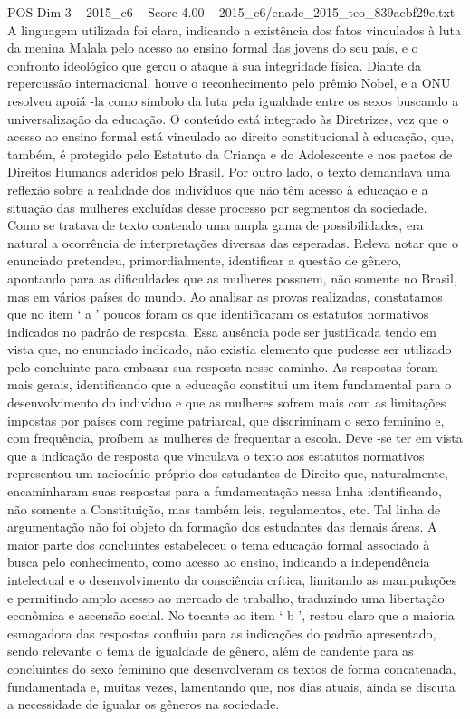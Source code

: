 \begin{textsample}{POS Dim 3 – 2015\_c6 – Score 4.00 – 2015\_c6/enade\_2015\_teo\_839aebf29e.txt}
A linguagem utilizada foi clara, indicando a existência dos fatos vinculados à luta da menina Malala pelo acesso ao ensino formal das jovens do seu país, e o confronto ideológico que gerou o ataque à sua integridade física.
Diante da repercussão internacional, houve o reconhecimento pelo prêmio Nobel, e a ONU resolveu apoiá -la como símbolo da luta pela igualdade entre os sexos buscando a universalização da educação.
O conteúdo está integrado às Diretrizes, vez que o acesso ao ensino formal está vinculado ao direito constitucional à educação, que, também, é protegido pelo Estatuto da Criança e do Adolescente e nos pactos de Direitos Humanos aderidos pelo Brasil.
Por outro lado, o texto demandava uma reflexão sobre a realidade dos indivíduos que não têm acesso à educação e a situação das mulheres excluídas desse processo por segmentos da sociedade.
Como se tratava de texto contendo uma ampla gama de possibilidades, era natural a ocorrência de interpretações diversas das esperadas.
Releva notar que o enunciado pretendeu, primordialmente, identificar a questão de gênero, apontando para as dificuldades que as mulheres possuem, não somente no Brasil, mas em vários países do mundo.
Ao analisar as provas realizadas, constatamos que no item ‘ a ’ poucos foram os que identificaram os estatutos normativos indicados no padrão de resposta.
Essa ausência pode ser justificada tendo em vista que, no enunciado indicado, não existia elemento que pudesse ser utilizado pelo concluinte para embasar sua resposta nesse caminho.
As respostas foram mais gerais, identificando que a educação constitui um item fundamental para o desenvolvimento do indivíduo e que as mulheres sofrem mais com as limitações impostas por países com regime patriarcal, que discriminam o sexo feminino e, com frequência, proíbem as mulheres de frequentar a escola.
Deve -se ter em vista que a indicação de resposta que vinculava o texto aos estatutos normativos representou um raciocínio próprio dos estudantes de Direito que, naturalmente, encaminharam suas respostas para a fundamentação nessa linha identificando, não somente a Constituição, mas também leis, regulamentos, etc.
Tal linha de argumentação não foi objeto da formação dos estudantes das demais áreas.
A maior parte dos concluintes estabeleceu o tema educação formal associado à busca pelo conhecimento, como acesso ao ensino, indicando a independência intelectual e o desenvolvimento da consciência crítica, limitando as manipulações e permitindo amplo acesso ao mercado de trabalho, traduzindo uma libertação econômica e ascensão social.
No tocante ao item ‘ b ’, restou claro que a maioria esmagadora das respostas confluiu para as indicações do padrão apresentado, sendo relevante o tema de igualdade de gênero, além de candente para as concluintes do sexo feminino que desenvolveram os textos de forma concatenada, fundamentada e, muitas vezes, lamentando que, nos dias atuais, ainda se discuta a necessidade de igualar os gêneros na sociedade.

\end{textsample}
